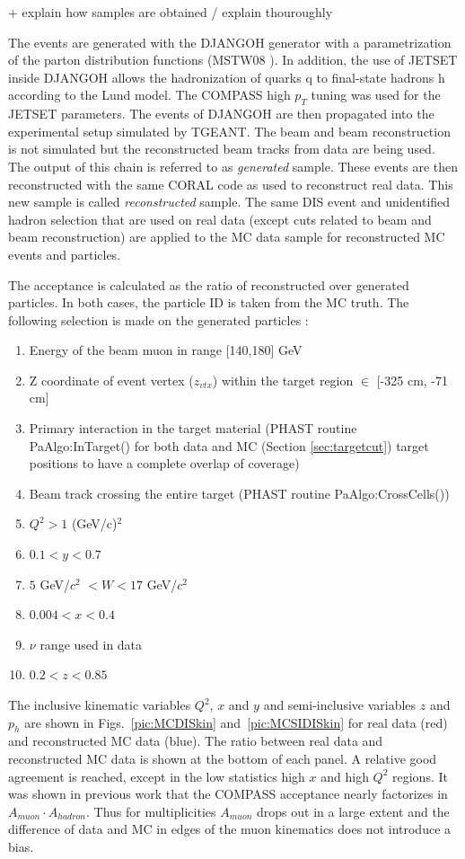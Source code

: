 + explain how samples are obtained / explain thouroughly

The events are generated with the DJANGOH generator with a parametrization of the parton distribution functions (MSTW08 \cite{MSTW08}). In addition, the use of JETSET inside DJANGOH allows the hadronization of quarks q to final-state hadrons h according to the Lund model. The COMPASS high $p_T$ tuning was used for the JETSET parameters. The events of DJANGOH are then propagated into the experimental setup simulated by TGEANT. The beam and beam reconstruction is not simulated but the reconstructed beam tracks from data are being used. The output of this chain is referred to as \textit{generated} sample. These events are then reconstructed with the same CORAL code as used to reconstruct real data. This new sample is called \textit{reconstructed} sample. The same DIS event and unidentified hadron selection that are used on real data (except cuts related to beam and beam reconstruction) are applied to the MC data sample for reconstructed MC events and particles.

The acceptance is calculated as the ratio of reconstructed over generated particles. In both cases, the particle ID is taken from the MC truth. The following selection is made on the generated particles :

\begin{enumerate}
  \item Energy of the beam muon in range [140,180] GeV
	\item Z coordinate of event vertex ($z_{vtx}$) within the target region $\in$ [-325 cm, -71 cm]
	\item Primary interaction in the target material (PHAST routine PaAlgo:InTarget() for both data and MC (Section \ref{sec:targetcut}) target positions to have a complete overlap of coverage)
	\item Beam track crossing the entire target (PHAST routine PaAlgo:CrossCells())
  \item $Q^2>1$ (GeV/c)$^2$
  \item $0.1 < y < 0.7$
	\item $5$ GeV/$c^2$ $< W < 17$ GeV/$c^2$
  \item $0.004 < x < 0.4$
  \item $\nu$ range used in data
  \item $0.2 < z < 0.85$
\end{enumerate}

The inclusive kinematic variables $Q^2$, $x$ and $y$ and semi-inclusive variables $z$ and $p_h$ are shown in Figs.~\ref{pic:MCDISkin} and~\ref{pic:MCSIDISkin} for real data (red) and reconstructed MC data (blue). The ratio between real data and reconstructed MC data is shown at the bottom of each panel. A relative good agreement is reached, except in the low statistics high $x$ and high $Q^2$ regions. It was shown in previous work that the COMPASS acceptance nearly factorizes in $A_{muon} \cdot A_{hadron}$. Thus for multiplicities $A_{muon}$ drops out in a large extent and the difference of data and MC in edges of the muon kinematics does not introduce a bias.

